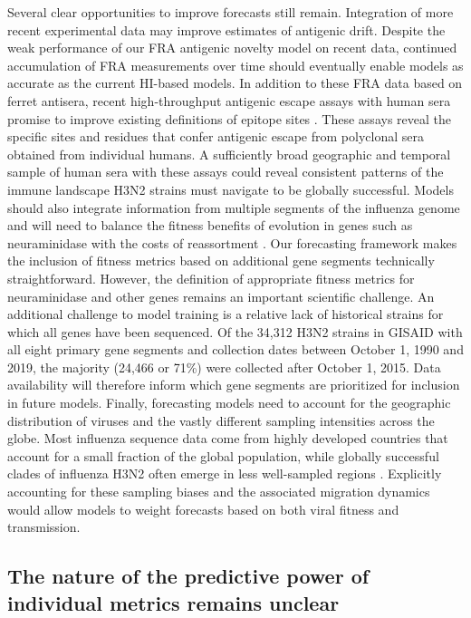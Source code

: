 Several clear opportunities to improve forecasts still remain.
Integration of more recent experimental data may improve estimates of antigenic drift.
Despite the weak performance of our FRA antigenic novelty model on recent data, continued accumulation of FRA measurements over time should eventually enable models as accurate as the current HI-based models.
In addition to these FRA data based on ferret antisera, recent high-throughput antigenic escape assays with human sera promise to improve existing definitions of epitope sites \cite{Lee2019}.
These assays reveal the specific sites and residues that confer antigenic escape from polyclonal sera obtained from individual humans.
A sufficiently broad geographic and temporal sample of human sera with these assays could reveal consistent patterns of the immune landscape H3N2 strains must navigate to be globally successful.
Models should also integrate information from multiple segments of the influenza genome and will need to balance the fitness benefits of evolution in genes such as neuraminidase \cite{Chen:2018kp} with the costs of reassortment \cite{Villa:2017iw}.
Our forecasting framework makes the inclusion of fitness metrics based on additional gene segments technically straightforward.
However, the definition of appropriate fitness metrics for neuraminidase and other genes remains an important scientific challenge.
An additional challenge to model training is a relative lack of historical strains for which all genes have been sequenced.
Of the 34,312 H3N2 strains in GISAID with all eight primary gene segments and collection dates between October 1, 1990 and 2019, the majority (24,466 or 71\%) were collected after October 1, 2015.
Data availability will therefore inform which gene segments are prioritized for inclusion in future models.
Finally, forecasting models need to account for the geographic distribution of viruses and the vastly different sampling intensities across the globe.
Most influenza sequence data come from highly developed countries that account for a small fraction of the global population, while globally successful clades of influenza H3N2 often emerge in less well-sampled regions \cite{Russell:2008ke,Rambaut:2008ew,Bedford:2015fj}.
Explicitly accounting for these sampling biases and the associated migration dynamics would allow models to weight forecasts based on both viral fitness and transmission.

\subsection*{The nature of the predictive power of individual metrics remains unclear}

